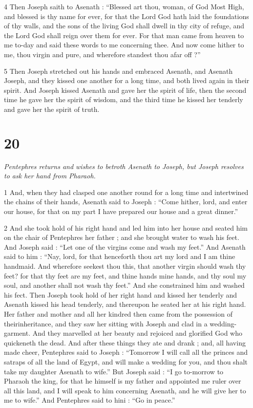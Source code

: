 4 Then Joseph saith to Asenath : “Blessed art thou, woman, of God Most High, and blessed is thy name for ever, for that the Lord God hath laid the foundations of thy walls, and the sons of the living God shall dwell in thy city of refuge, and the Lord God shall reign over them for ever. For that man came from heaven to me to-day and said these words to me concerning thee. And now come hither to me, thou virgin and pure, and wherefore standest thou afar off ?” 

5 Then Joseph stretched out his hands and embraced Asenath, and Asenath Joseph, and they kissed one another for a long time, and both lived again in their spirit. And Joseph kissed Asenath and gave her the spirit of life, then the second time he gave her the spirit of wisdom, and the third time he kissed her tenderly and gave her the spirit of truth. 

\chapter{20}

\par \textit{Pentephres returns and wishes to betroth Asenath to Joseph, but Joseph resolves to ask her hand from Pharaoh.}

1 And, when they had clasped one another round for a long time and intertwined the chains of their hands, Asenath said to Joseph : “Come hither, lord, and enter our house, for that on my part I have prepared our house and a great dinner.” 

2 And she took hold of his right hand and led him into her house and seated him on the chair of Pentephres her father ; and she brought water to wash his feet. And Joseph said : “Let one of the virgins come and wash my feet.” And Asenath said to him : “Nay, lord, for that henceforth thou art my lord and I am thine handmaid. And wherefore seekest thou this, that another virgin should wash thy feet? for that thy feet are my feet, and thine hands mine hands, and thy soul my soul, and another shall not wash thy feet.” And she constrained him and washed his fect. Then Joseph took hold of her right hand and kissed her tenderly and Asenath kissed his head tenderly, and thereupon he seated her at his right hand. Her father and mother and all her kindred then came from the possession of theirinheritance, and they saw her sitting with Joseph and clad in a wedding-garment. And they marvelled at her beauty and rejoiced and glorified God who quickeneth the dead. And after these things they ate and drank ; and, all having made cheer, Pentephres said to Joseph : “Tomorrow I will call all the princes and satraps of all the land of Egypt, and will make a wedding for you, and thou shalt take my daughter Asenath to wife.” But Joseph said : “I go to-morrow to Pharaoh the king, for that he himself is my father and appointed me ruler over all this land, and I will speak to him concerning Asenath, and he will give her to me to wife.” And Pentephres said to hini : “Go in peace.” 

